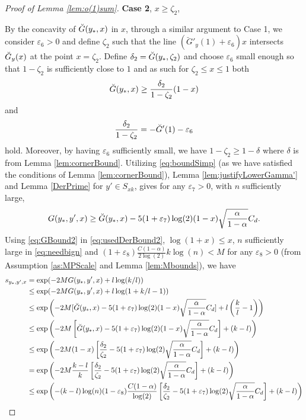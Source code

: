 \documentclass[12pt,reqno]{amsart}
\numberwithin{equation}{section}
\theoremstyle{definition}
\renewcommand{\epsilon}{\varepsilon}
\renewcommand{\[}{\begin{equation}}
\renewcommand{\]}{\end{equation}}
\renewcommand{\|}{\bigg{|}}
\begin{document}
\begin{proof}[Proof of Lemma \ref{lem:o(1)sum}]
    \textbf{Case 2}, $x \geq \zeta_2$,
    
    By the concavity of $\Breve{G}(y_*,x)$ in $x$, through a similar argument to Case 1, we consider $\epsilon_6 > 0$ and define $\zeta_2$ such that the line $(\breve{G}'_y(1) + \epsilon_6)x$ intersects $\Breve{G}_y(x)$ at the point $x = \zeta_2$. Define $\delta_2 = \Breve{G}(y_*, \zeta_2)$ and choose $\epsilon_6$ small enough so that $1-\zeta_2$ is sufficiently close to $1$ and as such for $\zeta_2 \leq x \leq 1$ both
    \[\Breve{G}(y_*,x) \geq \frac{\delta_2}{1-\zeta_2}(1-x)\]
    and
    \[\frac{\delta_2}{1-\zeta_2} = -\Breve{G}'(1) - \epsilon_6\]
    hold. Moreover, by having $\epsilon_6$ sufficiently small, we have $1-\zeta_2 \geq 1-\delta$ where $\delta$ is from Lemma \ref{lem:cornerBound}.
    Utilizing \eqref{eq:boundSimp} (as we have satisfied the conditions of Lemma \ref{lem:cornerBound}), Lemma \ref{lem:justifyLowerGamma'} and Lemma \ref{DerPrime} for $y' \in S_{xk}$, gives for any $\epsilon_7 > 0$, with $n$ sufficiently large, 
    \[G(y_*, y', x) \geq \Breve{G}(y_*,x) - 5(1+\epsilon_7)\log(2)(1-x)\sqrt{\frac{\alpha}{1-\alpha}}C_d. \label{eq:GBound2}\]
    Using \eqref{eq:GBound2} in \eqref{eq:usedDerBound2}, $\log(1+x) \leq x$, $n$ sufficiently large in \eqref{eq:needbign} and $(1 + \epsilon_{8})\frac{C(1-\alpha)}{2\log(2)}k\log(n) < M$ for any $\epsilon_8 > 0$ (from Assumption \ref{as:MPScale} and Lemma \ref{lem:Mbounds}), we have
    \begin{align}
        s_{y_*, y', x} &= \exp(-2MG(y_*, y', x) + l \log(k/l))\\
        &\leq \exp(-2MG(y_*, y', x) + l \log(1 + k/l - 1))\\
        &\leq \exp\left(-2M[\Breve{G}(y_*, x) - 5(1 + \epsilon_7)\log(2)(1-x)\sqrt{\frac{\alpha}{1-\alpha}}C_d] + l\left(\frac{k}{l}-1\right)\right)\label{eq:usedDerBound2}\\
        &\leq \exp\left(-2M\left[\Breve{G}(y_*, x) - 5(1+\epsilon_7)\log(2)(1-x)\sqrt{\frac{\alpha}{1-\alpha}}C_d\right] + (k-l)\right)\\
        &\leq \exp\left(-2M(1-x)\left[\frac{\delta_2}{\zeta_2} - 5(1+\epsilon_7)\log(2)\sqrt{\frac{\alpha}{1-\alpha}}C_d\right] + (k-l)\right)\\
        &= \exp\left(-2M\frac{k-l}{k}\left[\frac{\delta_2}{\zeta_2} - 5(1 + \epsilon_7)\log(2)\sqrt{\frac{\alpha}{1-\alpha}}C_d\right] + (k-l)\right)\\
        &\leq \exp\left(-(k-l)\log(n)(1-\epsilon_8)\frac{C(1-\alpha)}{\log(2)}\left[\frac{\delta_2}{\zeta_2} - 5(1 + \epsilon_7)\log(2)\sqrt{\frac{\alpha}{1-\alpha}}C_d\right] + (k-l)\right)\\

\end{align}
\end{proof}
\end{document}
